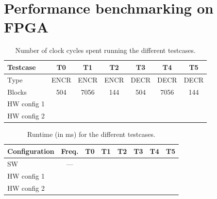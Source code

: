 \section{Performance benchmarking on FPGA}


\begin{table}[H]
\centering
\small
\begin{tabular}{l c c c c c c}
\toprule
\textbf{Testcase} & T0 & T1 & T2 & T3 & T4 & T5 \\
\midrule
Type   & ENCR & ENCR & ENCR & DECR & DECR & DECR \\
Blocks & 504 & 7056 & 144 & 504 & 7056 & 144 \\
\midrule
HW config 1 & & & & & & \\
HW config 2 & & & & & & \\
\bottomrule
\end{tabular}
\caption{Number of clock cycles spent running the different testcases.}
\label{tab:cycles}
\end{table}

\begin{table}[H]
\centering
\small
\begin{tabular}{l c c c c c c c}
\toprule
\textbf{Configuration} & \textbf{Freq.} & T0 & T1 & T2 & T3 & T4 & T5 \\
\midrule
SW          & --- & & & & & & \\
HW config 1 &     & & & & & & \\
HW config 2 &     & & & & & & \\
\bottomrule
\end{tabular}
\caption{Runtime (in ms) for the different testcases.}
\label{tab:runtime}
\end{table}

